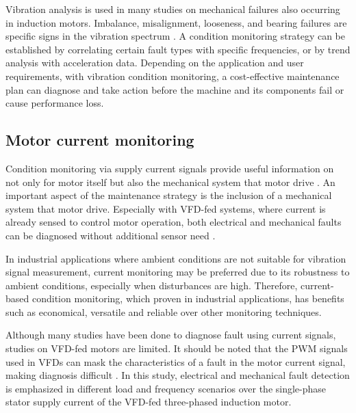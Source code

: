 Vibration analysis is used in many studies on mechanical failures also occurring in induction motors. Imbalance, misalignment, looseness, and bearing failures are specific signs in the vibration spectrum \cite{thorsen1998methods}. A condition monitoring strategy can be established by correlating certain fault types with specific frequencies, or by trend analysis with acceleration data. Depending on the application and user requirements, with vibration condition monitoring, a cost-effective maintenance plan can diagnose and take action before the machine and its components fail or cause performance loss.

\subsection{Motor current monitoring}

Condition monitoring via supply current signals provide useful information on not only for motor itself but also the mechanical system that motor drive \cite{thomson2001current}. An important aspect of the maintenance strategy is the inclusion of a mechanical system that motor drive. Especially with VFD-fed systems, where current is already sensed to control motor operation, both electrical and mechanical faults can be diagnosed without additional sensor need \cite{thomson2001current,gritli2017condition,corne2017misalignment,en201320958}. 

In industrial applications where ambient conditions are not suitable for vibration signal measurement, current monitoring may be preferred due to its robustness to ambient conditions, especially when disturbances are high.
Therefore, current-based condition monitoring, which proven in industrial applications, has benefits such as economical, versatile and reliable over other monitoring techniques.

Although many studies have been done to diagnose fault using current signals, studies on VFD-fed motors are limited. It should be noted that the PWM signals used in VFDs can mask the characteristics of a fault in the motor current signal, making diagnosis difficult \cite{shaeboub2018monitoring}. In this study, electrical and mechanical fault detection is emphasized in different load and frequency scenarios over the single-phase stator supply current of the VFD-fed three-phased induction motor.


